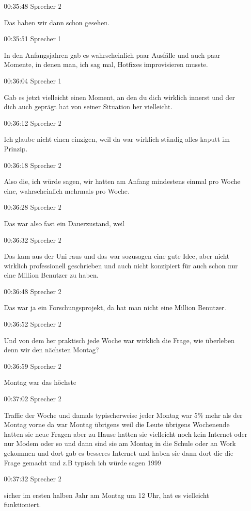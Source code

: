 00:35:48 Sprecher 2

Das haben wir dann schon gesehen.

00:35:51 Sprecher 1

In den Anfangsjahren gab es wahrscheinlich paar Ausfälle und auch paar
Momente, in denen man, ich sag mal, Hotfixes improvisieren musste.

00:36:04 Sprecher 1

Gab es jetzt vielleicht einen Moment, an den du dich wirklich innerst
und der dich auch geprägt hat von seiner Situation her vielleicht.

00:36:12 Sprecher 2

Ich glaube nicht einen einzigen, weil da war wirklich ständig alles
kaputt im Prinzip.

00:36:18 Sprecher 2

Also die, ich würde sagen, wir hatten am Anfang mindestens einmal pro
Woche eine, wahrscheinlich mehrmals pro Woche.

00:36:28 Sprecher 2

Das war also fast ein Dauerzustand, weil

00:36:32 Sprecher 2

Das kam aus der Uni raus und das war sozusagen eine gute Idee, aber
nicht wirklich professionell geschrieben und auch nicht konzipiert für
auch schon nur eine Million Benutzer zu haben.

00:36:48 Sprecher 2

Das war ja ein Forschungsprojekt, da hat man nicht eine Million
Benutzer.

00:36:52 Sprecher 2

Und von dem her praktisch jede Woche war wirklich die Frage, wie
überleben denn wir den nächsten Montag?

00:36:59 Sprecher 2

Montag war das höchste

00:37:02 Sprecher 2

Traffic der Woche und damals typischerweise jeder Montag war 5\% mehr
als der Montag vorne da war Montag übrigens weil die Leute übrigens
Wochenende hatten sie neue Fragen aber zu Hause hatten sie vielleicht
noch kein Internet oder nur Modem oder so und dann sind sie am Montag in
die Schule oder an Work gekommen und dort gab es besseres Internet und
haben sie dann dort die die Frage gemacht und z.B typisch ich würde
sagen 1999

00:37:32 Sprecher 2

sicher im ersten halben Jahr am Montag um 12 Uhr, hat es vielleicht
funktioniert.

